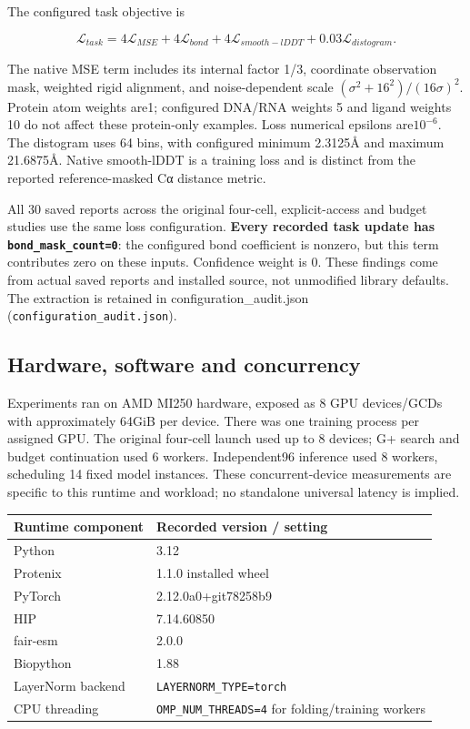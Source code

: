 The configured task objective is

\[
\mathcal L_{task}=4\mathcal L_{MSE}+4\mathcal L_{bond}
+4\mathcal L_{smooth-lDDT}+0.03\mathcal L_{distogram}.
\]

The native MSE term includes its internal factor 1/3, coordinate observation
mask, weighted rigid alignment, and noise-dependent scale
\((\sigma^2+16^2)/(16\sigma)^2\). Protein atom weights are1; configured DNA/RNA
weights 5 and ligand weights 10 do not affect these protein-only examples.
Loss numerical epsilons are\(10^{-6}\). The distogram uses 64 bins, with configured
minimum 2.3125Å and maximum 21.6875Å. Native smooth-lDDT is a training loss and
is distinct from the reported reference-masked Cα distance metric.

All 30 saved reports across the original four-cell, explicit-access and budget
studies use the same loss configuration. \textbf{Every recorded task update has
\nolinkurl{bond_mask_count=0}}: the configured bond coefficient is nonzero, but this term
contributes zero on these inputs. Confidence weight is 0. These findings come
from actual saved reports and installed source, not unmodified library defaults.
The extraction is retained in configuration\_audit.json (\nolinkurl{configuration_audit.json}).

\subsection{Hardware, software and concurrency}\label{hardware-software-and-concurrency}

Experiments ran on AMD MI250 hardware, exposed as 8 GPU devices/GCDs
with approximately 64GiB per device. There was one training process per assigned
GPU. The original four-cell launch used up to 8 devices; G+ search and budget
continuation used 6 workers. Independent96 inference used 8 workers, scheduling
14 fixed model instances. These concurrent-device measurements are specific
to this runtime and workload; no standalone universal latency is implied.

\begin{longtable}[]{@{}ll@{}}
\toprule\noalign{}
Runtime component & Recorded version / setting \\
\midrule\noalign{}
\endhead
\bottomrule\noalign{}
\endlastfoot
Python & 3.12 \\
Protenix & 1.1.0 installed wheel \\
PyTorch & 2.12.0a0+git78258b9 \\
HIP & 7.14.60850 \\
fair-esm & 2.0.0 \\
Biopython & 1.88 \\
LayerNorm backend & \nolinkurl{LAYERNORM_TYPE=torch} \\
CPU threading & \nolinkurl{OMP_NUM_THREADS=4} for folding/training workers \\
\end{longtable}

